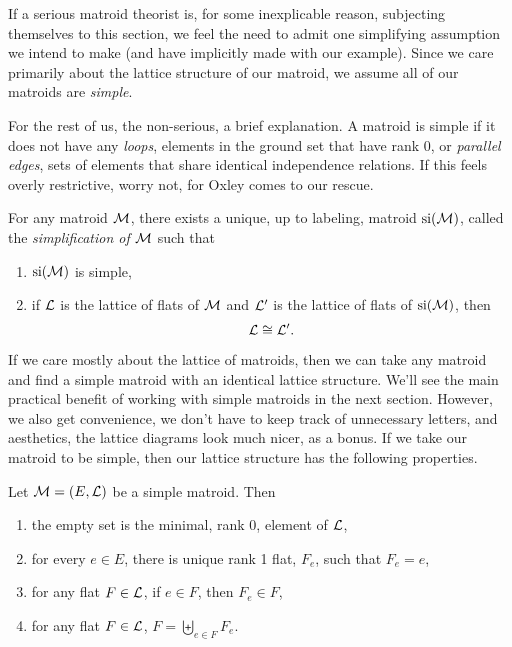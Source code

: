 \documentclass[12pt,oneside]{../../sfsuthesis}
\begin{document}
If a serious matroid theorist is, for some inexplicable reason, subjecting themselves to this section, we feel the need to admit one simplifying assumption we intend to make (and have implicitly made with our example).
Since we care primarily about the lattice structure of our matroid, we assume all of our matroids are \emph{simple}.

For the rest of us, the non-serious, a brief explanation.
A matroid is simple if it does not have any \emph{loops}, elements in the ground set that have rank 0, or \emph{parallel edges}, sets of elements that share identical independence relations.
If this feels overly restrictive, worry not, for Oxley\cite[p.~49]{oxleyMatroidTheory2011} comes to our rescue.
\begin{proposition}\th\label{thm:simplificationLattice}
    For any matroid \( \mathcal{M} \), there exists a unique, up to labeling, matroid \( \operatorname{si}(\mathcal{M}) \), called the \emph{simplification of \( \mathcal{M} \)}
    such that
    \begin{enumerate}[label=\roman*.]
        \item \( \operatorname{si}(\mathcal{M}) \) is simple,
        \item if \( \mathcal{L} \) is the lattice of flats of \( \mathcal{M} \) and \( \mathcal{L}' \) is the lattice of flats of \( \operatorname{si}(\mathcal{M}) \), then
              \[
                  \mathcal{L} \cong \mathcal{L}'.
              \]
    \end{enumerate}
\end{proposition}

If we care mostly about the lattice of matroids, then we can take any matroid and find a simple matroid with an identical lattice structure.
We'll see the main practical benefit of working with simple matroids in the next section.
However, we also get convenience, we don't have to keep track of unnecessary letters, and aesthetics, the lattice diagrams look much nicer, as a bonus.
If we take our matroid to be simple, then our lattice structure has the following properties.

\begin{proposition}\th\label{thm:simpMatroidProps}
    Let \( \mathcal{M} = (E, \mathcal{L}) \) be a simple matroid.
    Then
    \begin{enumerate}[label=\roman*.]
        \item the empty set is the minimal, rank 0, element of \( \mathcal{L} \),
        \item for every \( e \in E \), there is unique rank 1 flat, \( F_e \), such that \( F_e = e \),
        \item for any flat \( F \in \mathcal{L} \), if \( e \in F \), then \( F_e \in F \),
        \item for any flat \( F \in \mathcal{L} \), \( F = \biguplus_{e \in F}F_e \).
    \end{enumerate}
\end{proposition}
\end{document}
